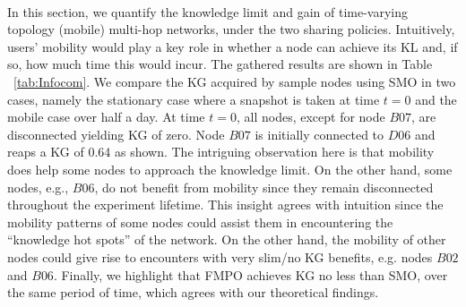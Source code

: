 \documentclass[12pt,epsf]{article}
\theoremstyle{definition}
\begin{document}
%
\vspace{0.1 cm}
\\
In this section, we quantify the knowledge limit and gain of time-varying topology (mobile) multi-hop networks, under the two sharing policies. 
Intuitively, users' mobility would play a key role in whether a node can achieve its 
KL and, if so, how much time this would incur. 
%
%
The gathered results are shown in Table ~\ref{tab:Infocom}. We compare the KG acquired by 
sample nodes using SMO in two cases, namely the stationary case where a snapshot is taken at time $t=0$ and the mobile case over half a day. At time $t=0$, 
all nodes, except for node $B07$, are disconnected yielding KG of zero. Node $B07$ is initially connected to $D06$ and reaps a KG of 0.64 as shown. The intriguing observation here is that mobility does help some nodes to approach the knowledge limit. On the other hand, some nodes, e.g., $B06$, do not benefit from mobility since they remain disconnected throughout the 
experiment lifetime. This insight agrees with intuition since the mobility patterns of some nodes could assist them in encountering the ``knowledge hot spots'' of the network.
On the other hand, the mobility of other nodes could give rise to encounters with very slim/no 
KG benefits, e.g. nodes $B02$ and $B06$. Finally, we highlight that FMPO achieves KG no less than SMO, over the same period of time, which agrees with our theoretical findings.
\end{document}
